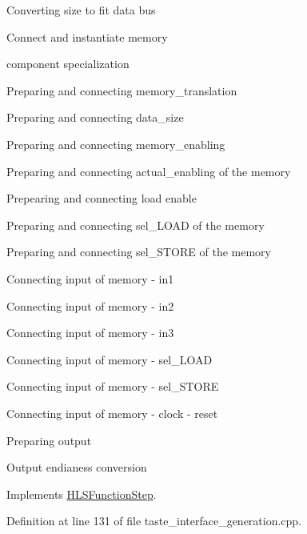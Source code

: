 Converting size to fit data bus

Connect and instantiate memory

component specialization

Preparing and connecting memory\+\_\+translation

Preparing and connecting data\+\_\+size

Preparing and connecting memory\+\_\+enabling

Preparing and connecting actual\+\_\+enabling of the memory

Prepearing and connecting load enable

Preparing and connecting sel\+\_\+\+L\+O\+AD of the memory

Preparing and connecting sel\+\_\+\+S\+T\+O\+RE of the memory

Connecting input of memory -\/ in1

Connecting input of memory -\/ in2

Connecting input of memory -\/ in3

Connecting input of memory -\/ sel\+\_\+\+L\+O\+AD

Connecting input of memory -\/ sel\+\_\+\+S\+T\+O\+RE

Connecting input of memory -\/ clock -\/ reset

Preparing output

Output endianess conversion 

Implements \hyperlink{classHLSFunctionStep_a8db4c00d080655984d98143206fc9fa8}{H\+L\+S\+Function\+Step}.



Definition at line 131 of file taste\+\_\+interface\+\_\+generation.\+cpp.



